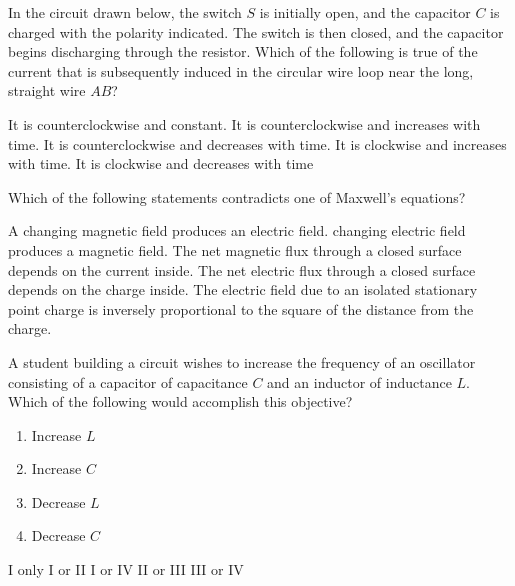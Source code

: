\documentclass[12pt]{../../oss-classkick-exam}
\begin{document}
\begin{questions}
  \uplevel{\rule{\linewidth}{.5pt}}
  
  \question In the circuit drawn below, the switch $S$ is initially open, and
  the capacitor $C$ is charged with the polarity indicated. The switch is then
  closed, and the capacitor begins discharging through the resistor. Which of
  the following is true of the current that is subsequently induced in the
  circular wire loop near the long, straight wire $AB$?

  \begin{minipage}{.3\linewidth}
  \end{minipage}
  \begin{minipage}{.59\linewidth}
    \begin{choices}
      \choice It is counterclockwise and constant.
      \choice It is counterclockwise and increases with time.
      \choice It is counterclockwise and decreases with time.
      \choice It is clockwise and increases with time.
      \choice It is clockwise and decreases with time
    \end{choices}
  \end{minipage}
  \newpage
  
  \question Which of the following statements contradicts one of Maxwell's
  equations?
  \begin{choices}
    \choice A changing magnetic field produces an electric field.
    \choice changing electric field produces a magnetic field.
    \choice The net magnetic flux through a closed surface depends on the
    current inside.
    \choice The net electric flux through a closed surface depends on the
    charge inside.
    \choice The electric field due to an isolated stationary point charge is
    inversely proportional to the square of the distance from the charge.
  \end{choices}

  \uplevel{\rule{\linewidth}{.5pt}}
  
  \question A student building a circuit wishes to increase the frequency of an
  oscillator consisting of a capacitor of capacitance $C$ and an inductor of
  inductance $L$. Which of the following would accomplish this objective?
  \begin{enumerate}[nosep,label={\Roman*.}]
  \item Increase $L$
  \item Increase $C$
  \item Decrease $L$
  \item Decrease $C$
  \end{enumerate}
  \begin{oneparchoices}
    \choice I only\hspace{.3in}
    \choice I or II\hspace{.3in}
    \choice I or IV\hspace{.3in}
    \choice II or III\hspace{.3in}
    \choice III or IV
  \end{oneparchoices}
\end{questions}
\end{document}
